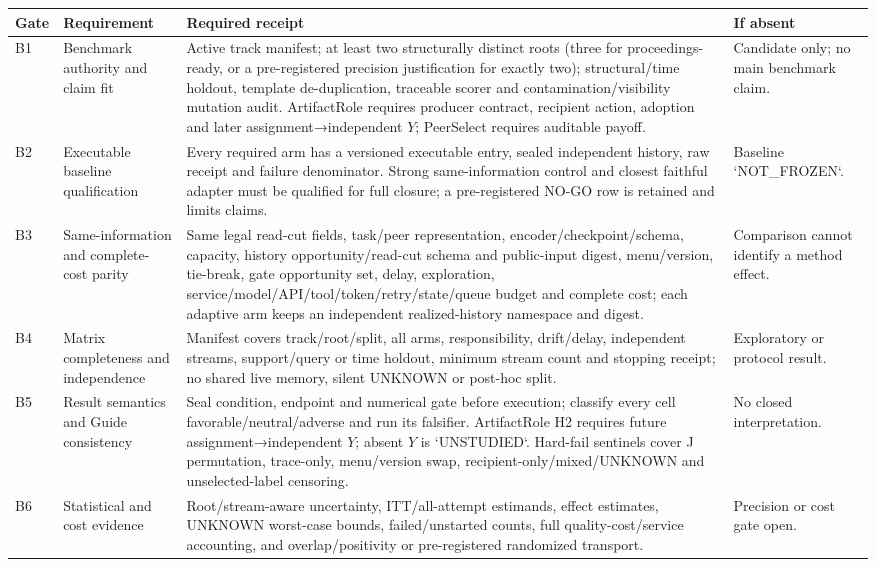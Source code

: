\documentclass[10pt,a4paper]{article}
\begin{document}
\begin{center}\scriptsize\setlength{\tabcolsep}{2pt}\renewcommand{\arraystretch}{0.98}
\begin{tabularx}{\linewidth}{@{}lL{.22\linewidth}X L{.21\linewidth}@{}}\toprule
Gate & Requirement & Required receipt & If absent\\\midrule
B1 & Benchmark authority and claim fit & Active track manifest; at least two structurally distinct roots (three for proceedings-ready, or a pre-registered precision justification for exactly two); structural/time holdout, template de-duplication, traceable scorer and contamination/visibility mutation audit. ArtifactRole requires producer contract, recipient action, adoption and later assignment→independent $Y$; PeerSelect requires auditable payoff. & Candidate only; no main benchmark claim.\\
B2 & Executable baseline qualification & Every required arm has a versioned executable entry, sealed independent history, raw receipt and failure denominator. Strong same-information control and closest faithful adapter must be qualified for full closure; a pre-registered NO-GO row is retained and limits claims. & Baseline `NOT\_FROZEN`.\\
B3 & Same-information and complete-cost parity & Same legal read-cut fields, task/peer representation, encoder/checkpoint/schema, capacity, history opportunity/read-cut schema and public-input digest, menu/version, tie-break, gate opportunity set, delay, exploration, service/model/API/tool/token/retry/state/queue budget and complete cost; each adaptive arm keeps an independent realized-history namespace and digest. & Comparison cannot identify a method effect.\\
B4 & Matrix completeness and independence & Manifest covers track/root/split, all arms, responsibility, drift/delay, independent streams, support/query or time holdout, minimum stream count and stopping receipt; no shared live memory, silent UNKNOWN or post-hoc split. & Exploratory or protocol result.\\
B5 & Result semantics and Guide consistency & Seal condition, endpoint and numerical gate before execution; classify every cell favorable/neutral/adverse and run its falsifier. ArtifactRole H2 requires future assignment→independent $Y$; absent $Y$ is `UNSTUDIED`. Hard-fail sentinels cover J permutation, trace-only, menu/version swap, recipient-only/mixed/UNKNOWN and unselected-label censoring. & No closed interpretation.\\
B6 & Statistical and cost evidence & Root/stream-aware uncertainty, ITT/all-attempt estimands, effect estimates, UNKNOWN worst-case bounds, failed/unstarted counts, full quality-cost/service accounting, and overlap/positivity or pre-registered randomized transport. & Precision or cost gate open.\\

\end{tabularx}
\end{center}
\end{document}
